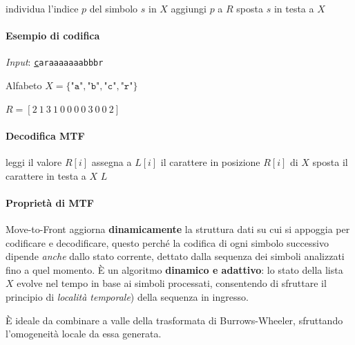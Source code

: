 \begin{algorithm}[H]
\caption{Codifica Move-To-Front}
\begin{algorithmic}
    \State individua l'indice $p$ del simbolo $s$ in $X$
    \State aggiungi $p$ a $R$
    \State sposta $s$ in testa a $X$
\EndFor
\end{algorithmic}
\end{algorithm}



\paragraph{Esempio di codifica}
\textit{Input}: \texttt{\underline{c}araaaaaaabbbr}

Alfabeto $X = \{\texttt{"a"}, \texttt{"b"}, \texttt{"c"}, \texttt{"r"}\}$


$R = [2\ 1\ 3\ 1\ 0\ 0\ 0\ 0\ 3\ 0\ 0\ 2]$

\paragraph{Decodifica MTF}

\begin{algorithm}[H]
\caption{Decodifica Move-To-Front}
\begin{algorithmic}
    \State leggi il valore $R[i]$
    \State assegna a $L[i]$ il carattere in posizione $R[i]$ di $X$
    \State sposta il carattere in testa a $X$
\EndFor
\State \Return $L$
\end{algorithmic}
\end{algorithm}

\paragraph{Proprietà di MTF}
Move-to-Front aggiorna \textbf{dinamicamente} la struttura dati su cui si appoggia per codificare e decodificare, questo perché la codifica di ogni simbolo successivo dipende \textit{anche} dallo stato corrente, dettato dalla sequenza dei simboli analizzati fino a quel momento. È un algoritmo \textbf{dinamico e adattivo}: lo stato della lista $X$ evolve nel tempo in base ai simboli processati, consentendo di sfruttare il principio di \textit{località temporale}) della sequenza in ingresso.

È ideale da combinare a valle della trasformata di Burrows-Wheeler, sfruttando l'omogeneità locale da essa generata.

